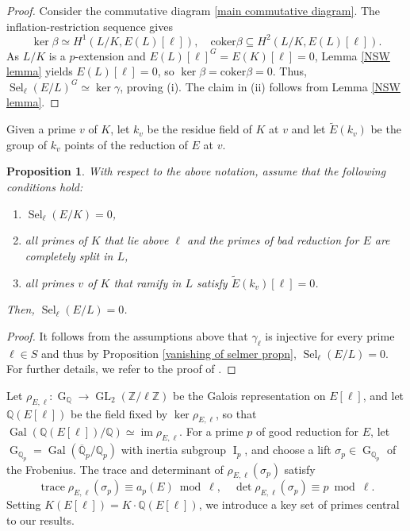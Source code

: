 \documentclass[11pt,reqno]{amsart}
\newtheorem{proposition}[theorem]{Proposition}
\newcommand{\Z}{\mathbb{Z}}
\newcommand{\Q}{\mathbb{Q}}
\newcommand{\coker}{\mathrm{coker}}
\newcommand{\op}[1]{\operatorname{#1}}
\numberwithin{equation}{section}
\begin{document}
\begin{proof}
Consider the commutative diagram \eqref{main commutative diagram}. The inflation-restriction sequence gives
\[
\ker \beta \simeq H^1(L/K, E(L)[\ell]), \quad \coker \beta \subseteq H^2(L/K, E(L)[\ell]).
\]
As \( L/K \) is a \( p \)-extension and \( E(L)[\ell]^G = E(K)[\ell] = 0 \), Lemma \ref{NSW lemma} yields \( E(L)[\ell] = 0 \), so \( \ker \beta = \coker \beta = 0 \). Thus, \( \op{Sel}_\ell(E/L)^G \simeq \ker \gamma \), proving (i). The claim in (ii) follows from Lemma \ref{NSW lemma}.
\end{proof}

Given a prime $v$ of $K$, let $k_v$ be the residue field of $K$ at $v$ and let $\widetilde{E}(k_v)$ be the group of $k_v$ points of the reduction of $E$ at $v$.
\begin{proposition}\label{basic prop for Sel(E/L)=0}
    With respect to the above notation, assume that the following conditions hold:
    \begin{enumerate}
        \item[(i)] $\op{Sel}_\ell(E/K)=0$,
        \item[(ii)] all primes of $K$ that lie above $\ell$ and the primes of bad reduction for $E$ are completely split in $L$,
        \item[(iii)] all primes $v$ of $K$ that ramify in $L$ satisfy $\widetilde{E}(k_v)[\ell]=0$.
    \end{enumerate}
Then, $\op{Sel}_\ell(E/L)=0$. 
\end{proposition}
\begin{proof}
    It follows from the assumptions above that $\gamma_\ell$ is injective for every prime $\ell\in S$ and thus by Proposition \ref{vanishing of selmer propn}, $\op{Sel}_\ell(E/L)=0$. For further details, we refer to the proof of \cite[Proposition 2.9]{pathakray}.
    \end{proof}
Let \(\rho_{E, \ell}:\op{G}_{\Q} \to \op{GL}_2(\Z/\ell\Z)\) be the Galois representation on \(E[\ell]\), and let \(\Q(E[\ell])\) be the field fixed by \(\ker \rho_{E,\ell}\), so that \(\op{Gal}(\Q(E[\ell])/\Q) \simeq \op{im} \rho_{E,\ell}\). For a prime \(p\) of good reduction for \(E\), let \(\op{G}_{\Q_p} = \op{Gal}(\overline{\Q}_p/\Q_p)\) with inertia subgroup \(\op{I}_p\), and choose a lift \(\sigma_p \in \op{G}_{\Q_p}\) of the Frobenius. The trace and determinant of \(\rho_{E,\ell}(\sigma_p)\) satisfy  
\[
\op{trace} \rho_{E,\ell}(\sigma_p) \equiv a_p(E) \bmod \ell, \quad \op{det} \rho_{E, \ell}(\sigma_p) \equiv p \bmod \ell.
\]
Setting \(K(E[\ell]) = K\cdot \Q(E[\ell])\), we introduce a key set of primes central to our results. 
\end{document}
